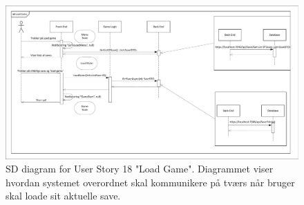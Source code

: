 \begin{figure}[H]
\centering
\includegraphics[width = \textwidth]{02-Body/Images/Arkitektur-SDLoadGame}
\caption{SD diagram for User Story 18 "Load Game". Diagrammet viser hvordan systemet overordnet skal kommunikere på tværs når bruger skal loade sit aktuelle save. }
\label{fig:Arkitektur-SD-LoadGame}
\end{figure}







